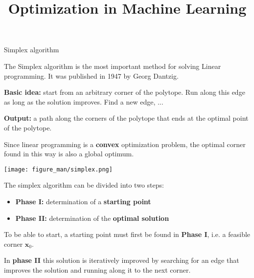 \documentclass[11pt,compress,t,notes=noshow, xcolor=table]{beamer}
\title{Optimization in Machine Learning}
\begin{document}
\begin{vbframe}{Simplex algorithm}

The Simplex algorithm is the most important method for solving Linear programming. It was published in 1947 by Georg Dantzig.

\lz

\textbf{Basic idea:} start from an arbitrary corner of the polytope. Run along this edge as long as the solution improves. Find a new edge, ...

\lz

\textbf{Output:} a path along the corners of the polytope that ends at the optimal point of the polytope.

\lz

Since linear programming is a \textbf{convex} optimization problem, the optimal corner found in this way is also a global optimum.

\framebreak

\begin{center}
\texttt{[image: figure\_man/simplex.png]}
\end{center}

\framebreak

The simplex algorithm can be divided into two steps:

\begin{itemize}
\item \textbf{Phase I:} determination of a \textbf{starting point}
\item \textbf{Phase II:} determination of the \textbf{optimal solution}
\end{itemize}

To be able to start, a starting point must first be found in \textbf{Phase I}, i.e. a feasible corner $\bm{x}_0$.

\lz

In \textbf{phase II} this solution is iteratively improved by searching for an edge that improves the solution and running along it to the next corner.


\end{vbframe}
\end{document}
